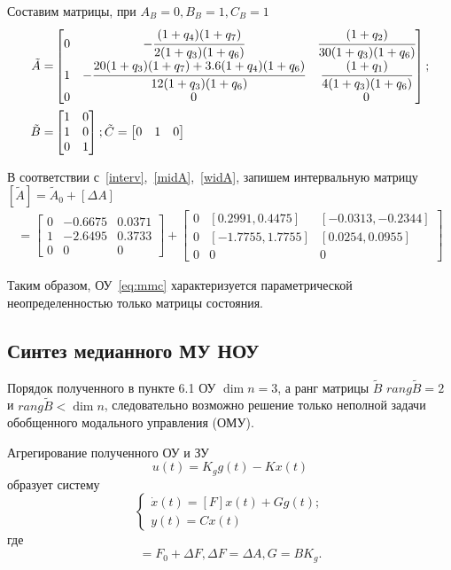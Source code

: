 Составим матрицы, при $A_B = 0, B_B = 1, C_B = 1$
\begin{align}
	\tilde{A} =&
	\begin{bmatrix}
		0 & - \cfrac{(1+q_4)(1+q_7)}{2(1+q_3)(1+q_6)} &	\cfrac{(1 + q_2)}{30(1+q_3)(1+q_6)}\\
		1 &-\cfrac{20(1+q_3)(1+q_7)+3.6(1+q_4)(1+q_6)}{12(1+q_3)(1+q_6)} & \cfrac{(1 + q_1)}{4(1+q_3)(1+q_6)} \\
		0&0&0
	\end{bmatrix};\\
	\tilde{B} =&
	\begin{bmatrix}
	1&0\\
	1&0\\
	0&1
	\end{bmatrix};
	\tilde{C} =
	\begin{bmatrix}
	0 & 1 & 0
	\end{bmatrix}
\end{align}

В соответствии с~\ref{interv},~\ref{midA},~\ref{widA}, запишем интервальную матрицу $[\tilde{A}] = \tilde{A}_0 + [\Delta A]$
\begin{align}
	[\tilde{A}] =
	\begin{bmatrix}
		0&-0.6675  &0.0371 \\
		1& -2.6495 &0.3733\\
		0&0&0	
	\end{bmatrix}
	+
	\begin{bmatrix}
0&	[0.2991, 0.4475]	&[-0.0313, -0.2344] \\
0&	[-1.7755, 1.7755]	&[0.0254, 0.0955]\\
0&0&0
	\end{bmatrix}
\end{align}

Таким образом, ОУ~\ref{eq:mmc} характеризуется параметрической неопределенностью только матрицы состояния.


\subsection{Синтез медианного МУ НОУ}

Порядок полученного в пункте 6.1 ОУ $\dim n = 3$, а ранг матрицы $\tilde{B}$ $rang \tilde{B} = 2$ и $rang \tilde{B} < \dim n$, следовательно возможно решение только неполной задачи обобщенного модального управления (ОМУ).

Агрегирование полученного ОУ и ЗУ
\begin{equation}
	u (t) = K_g g(t) - K x(t)
\end{equation}
образует систему 
\begin{equation}
	\begin{cases}
		\dot x (t) = [F] x(t) + G g(t);\\
		y(t) = C x(t)
	\end{cases}
\end{equation}
где 
\begin{equation}
	[F] = F_0 + \Delta F, \Delta F = \Delta A, G = B K_g.
\end{equation}

